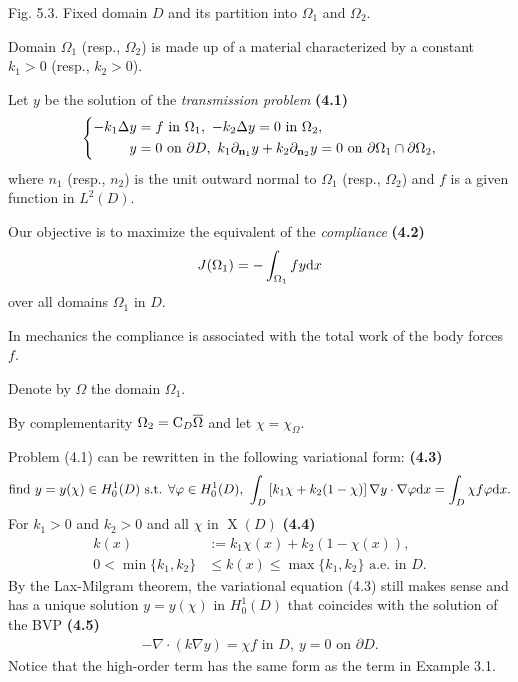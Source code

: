 \documentclass{book}
\numberwithin{equation}{section}
\begin{document}
\begin{enumerate}
    \textsf{Fig. 5.3. Fixed domain $D$ and its partition into $\Omega_1$ and $\Omega_2$.}
    
    Domain $\Omega_1$ (resp., $\Omega_2$) is made up of a material characterized by a constant $k_1 > 0$ (resp., $k_2 > 0$).
    
    Let $y$ be the solution of the \textit{transmission problem} \textbf{(4.1)}
    \begin{equation*}
        \left\{\begin{split}
            -k_1\Delta y &= f \mbox{ in } \Omega_1,\ -k_2\Delta y = 0 \mbox{ in } \Omega_2,\\
            y &= 0 \mbox{ on } \partial D,\ k_1\partial_{{\bf n}_1}y + k_2\partial_{{\bf n}_2}y = 0 \mbox{ on } \partial\Omega_1\cap\partial\Omega_2,
        \end{split}\right.
    \end{equation*}
    where $n_1$ (resp., $n_2$) is the unit outward normal to $\Omega_1$ (resp., $\Omega_2$) and $f$ is a given function in $L^2(D)$.
    
    Our objective is to maximize the equivalent of the \textit{compliance} \textbf{(4.2)}
    \begin{align*}
        J(\Omega_1) = -\int_{\Omega_1} fy{\rm d}x
    \end{align*}
    over all domains $\Omega_1$ in $D$.
    
    In mechanics the compliance is associated with the total work of the body forces $f$.
    
    Denote by $\Omega$ the domain $\Omega_1$.
    
    By complementarity $\Omega_2 = {\rm C}_D\overline{\Omega}$ and let $\chi = \chi_\Omega$.
    
    Problem (4.1) can be rewritten in the following variational form: \textbf{(4.3)}
    \begin{align*}
        \mbox{find } y = y(\chi)\in H_0^1(D) \mbox{ s.t. } \forall\varphi\in H_0^1(D),\ \int_D \left[k_1\chi + k_2(1 - \chi)\right]\nabla y\cdot\nabla\varphi{\rm d}x = \int_D \chi f\varphi{\rm d}x.
    \end{align*}
    For $k_1 > 0$ and $k_2 > 0$ and all $\chi$ in $\operatorname{X}(D)$ \textbf{(4.4)}
    \begin{align*}
        k(x) &:= k_1\chi(x) + k_2\left(1 - \chi(x)\right),\\
        0 < \min\{k_1,k_2\}&\le k(x)\le\max\{k_1,k_2\} \mbox{ a.e. in } D.
    \end{align*}
    By the Lax-Milgram theorem, the variational equation (4.3) still makes sense and has a unique solution $y = y(\chi)$ in $H_0^1(D)$ that coincides with the solution of the BVP \textbf{(4.5)}
    \begin{align*}
        -\nabla\cdot\left(k\nabla y\right) = \chi f \mbox{ in } D,\ y = 0 \mbox{ on } \partial D.
    \end{align*}
    Notice that the high-order term has the same form as the term in Example 3.1.
    

\end{enumerate}
\end{document}
